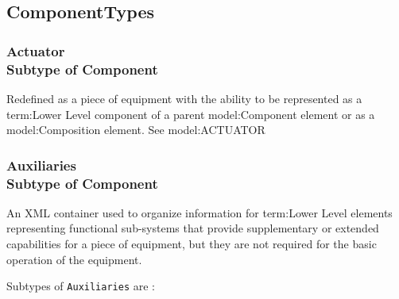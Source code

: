 \subsection{ComponentTypes} \label{model:ComponentTypes}
\subsubsection[Actuator]{Actuator \\ {\small Subtype of Component}}
  \label{type:Actuator}

\FloatBarrier

Redefined as a piece of equipment with the ability to be represented as a {term:Lower Level} component of a parent {model:Component} element or as a {model:Composition} element. See {model:ACTUATOR}

\FloatBarrier
\subsubsection[Auxiliaries]{Auxiliaries \\ {\small Subtype of Component}}
  \label{type:Auxiliaries}

\FloatBarrier

An XML container used to organize information for {term:Lower Level} elements representing functional sub-systems that provide supplementary or extended capabilities for a piece of equipment, but they are not required for the basic operation of the equipment.

Subtypes of \texttt{Auxiliaries} are :

